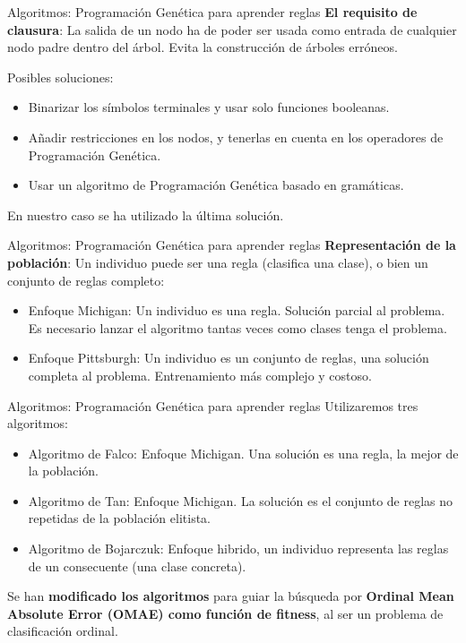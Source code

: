 \documentclass{beamer}
\begin{document}
\begin{frame}{Algoritmos: Programación Genética para aprender reglas}
	\textbf{El requisito de clausura}: La salida de un nodo ha de poder ser usada como entrada de cualquier nodo padre dentro del árbol. Evita la construcción de árboles erróneos.

	Posibles soluciones:

	\begin{itemize}
		\item Binarizar los símbolos terminales y usar solo funciones booleanas.
		\item Añadir restricciones en los nodos, y tenerlas en cuenta en los operadores de Programación Genética.
		\item Usar un algoritmo de Programación Genética basado en gramáticas.
	\end{itemize}

	En nuestro caso se ha utilizado la última solución.

\end{frame}

\begin{frame}{Algoritmos: Programación Genética para aprender reglas}
	\textbf{Representación de la población}: Un individuo puede ser una regla (clasifica una clase), o bien un conjunto de reglas completo:

	\begin{itemize}
		\item Enfoque Michigan: Un individuo es una regla. Solución parcial al problema. Es necesario lanzar el algoritmo tantas veces como clases tenga el problema.
		\item Enfoque Pittsburgh: Un individuo es un conjunto de reglas, una solución completa al problema. Entrenamiento más complejo y costoso.
	\end{itemize}

\end{frame}

\begin{frame}{Algoritmos: Programación Genética para aprender reglas}
	Utilizaremos tres algoritmos:

	\begin{itemize}
		\item Algoritmo de Falco: Enfoque Michigan. Una solución es una regla, la mejor de la población.
		\item Algoritmo de Tan: Enfoque Michigan. La solución es el conjunto de reglas no repetidas de la población elitista.
		\item Algoritmo de Bojarczuk: Enfoque hibrido, un individuo representa las reglas de un consecuente (una clase concreta).
	\end{itemize}

	Se han \textbf{modificado los algoritmos} para guiar la búsqueda por \textbf{Ordinal Mean Absolute Error (OMAE) como función de fitness}, al ser un problema de clasificación ordinal.

\end{frame}
\end{document}
